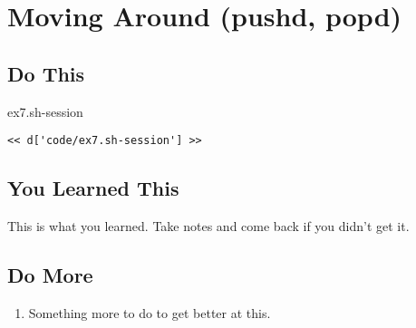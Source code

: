 \chapter{Moving Around (pushd, popd)}

\section{Do This}

\begin{code}{ex7.sh-session}
\begin{Verbatim}
<< d['code/ex7.sh-session'] >>
\end{Verbatim}
\end{code}


\section{You Learned This}

This is what you learned.  Take notes and come back if you didn't get it.

\section{Do More}

\begin{enumerate}
\item Something more to do to get better at this.
\end{enumerate}

